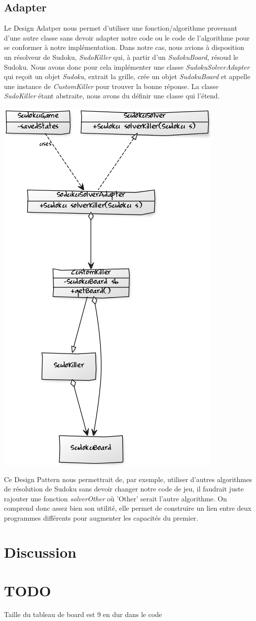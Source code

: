 \documentclass[a4paper]{article}
\begin{document}
\subsection{Adapter}
Le Design Adatper nous permet d'utiliser une fonction/algorithme provenant d'une autre classe sans devoir adapter notre code ou le code de l'algorithme pour se conformer à notre implémentation.
Dans notre cas, nous avions à disposition un résolveur de Sudoku, \textit{SudoKiller} qui, à partir d'un \textit{SudokuBoard}, résoud le Sudoku.
Nous avons donc pour cela implémenter une classe \textit{SudokuSolverAdapter} qui reçoit un objet \textit{Sudoku}, extrait la grille, crée un objet \textit{SudokuBoard} et appelle une instance de \textit{CustomKiller} pour trouver la bonne réponse.
La classe \textit{SudoKiller} étant abstraite, nous avons du définir une classe qui l'étend.
\begin{center}
\includegraphics[scale=0.7]{../adapter.png}
\end{center}
Ce Design Pattern nous permettrait de, par exemple, utiliser d'autres algorithmes de résolution de Sudoku sans devoir changer notre code de jeu, il faudrait juste rajouter une fonction \textit{solverOther} où 'Other' serait l'autre algorithme.
On comprend donc assez bien son utilité, elle permet de construire un lien entre deux programmes différents pour augmenter les capacités du premier.
\newpage
\section{Discussion}

\section{TODO}
Taille du tableau de board est 9 en dur dans le code
\end{document}
